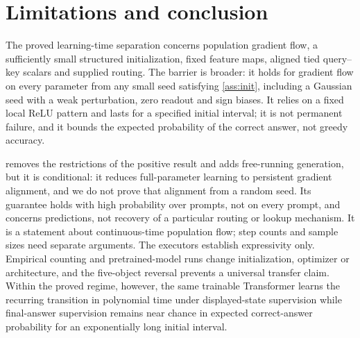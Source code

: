 \section{Limitations and conclusion}\label{sec:conclusion}
The proved learning-time separation concerns population gradient flow, a sufficiently small structured initialization, fixed feature maps, aligned tied query--key scalars and supplied routing. The barrier is broader: it holds for gradient flow on every parameter from any small seed satisfying \cref{ass:init}, including a Gaussian seed with a weak perturbation, zero readout and sign biases. It relies on a fixed local ReLU pattern and lasts for a specified initial interval; it is not permanent failure, and it bounds the expected probability of the correct answer, not greedy accuracy.

 removes the restrictions of the positive result and adds free-running generation, but it is conditional: it reduces full-parameter learning to persistent gradient alignment, and we do not prove that alignment from a random seed. Its guarantee holds with high probability over prompts, not on every prompt, and concerns predictions, not recovery of a particular routing or lookup mechanism. It is a statement about continuous-time population flow; step counts and sample sizes need separate arguments. The executors establish expressivity only. Empirical counting and pretrained-model runs change initialization, optimizer or architecture, and the five-object reversal prevents a universal transfer claim. Within the proved regime, however, the same trainable Transformer learns the recurring transition in polynomial time under displayed-state supervision while final-answer supervision remains near chance in expected correct-answer probability for an exponentially long initial interval.
